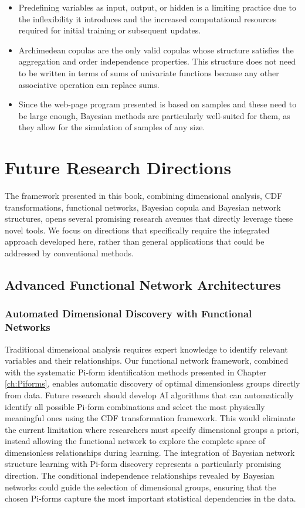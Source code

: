 \documentclass[
	11pt, %
	fleqn, %
	a4paper, %
]{LegrandOrangeBook}
\begin{document}
\begin{itemize}
\item Predefining variables as input, output, or hidden is a limiting practice due to the inflexibility it introduces and the increased computational resources required for initial training or subsequent updates.

\item Archimedean copulas are the only valid copulas whose structure satisfies the aggregation and order independence properties. This structure does not need to be written in terms of sums of univariate functions because any other associative operation can replace sums.

\item Since the web-page program presented is based on samples and these need to be large enough, Bayesian methods are particularly well-suited for them, as they allow for the simulation of samples of any size.
\end{itemize}


\chapter{Future Research Directions}
\label{Futuredirections}
The framework presented in this book, combining dimensional analysis, CDF transformations, functional networks, Bayesian copula and Bayesian network structures, opens several promising research avenues that directly leverage these novel tools. We focus on directions that specifically require the integrated approach developed here, rather than general applications that could be addressed by conventional methods.

\section{Advanced Functional Network Architectures}
\subsection{Automated Dimensional Discovery with Functional Networks}
Traditional dimensional analysis requires expert knowledge to identify relevant variables and their relationships. Our functional network framework, combined with the systematic Pi-form identification methods presented in Chapter \ref{ch:Piforms}, enables automatic discovery of optimal dimensionless groups directly from data.
Future research should develop AI algorithms that can automatically identify all possible Pi-form combinations and select the most physically meaningful ones using the CDF transformation framework. This would eliminate the current limitation where researchers must specify dimensional groups a priori, instead allowing the functional network to explore the complete space of dimensionless relationships during learning.
The integration of Bayesian network structure learning with Pi-form discovery represents a particularly promising direction. The conditional independence relationships revealed by Bayesian networks could guide the selection of dimensional groups, ensuring that the chosen Pi-forms capture the most important statistical dependencies in the data.
\end{document}
